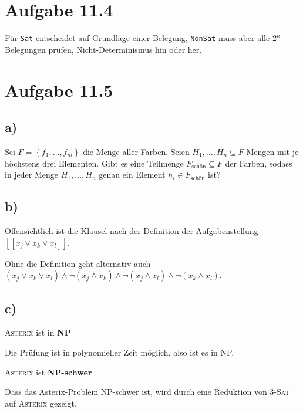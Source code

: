 \documentclass{article}
\begin{document}
\section*{Aufgabe 11.4}
Für \texttt{Sat} entscheidet auf Grundlage einer Belegung, \texttt{NonSat} muss aber alle $2^n$ Belegungen prüfen, Nicht-Determinismus hin oder her. 



\section*{Aufgabe 11.5}
\subsection*{a)}
Sei $F = \left\{f_1, \dots, f_m\right\}$ die Menge aller Farben. Seien $H_1, \dots, H_n \subseteq F$ Mengen mit je höchstens drei Elementen. Gibt es eine Teilmenge $F_{\text{schön}}\subseteq F$ der Farben, sodass in jeder Menge $H_1, \dots, H_n$ genau ein Element $h_i \in F_{\text{schön}}$ ist?


\subsection*{b)}
Offensichtlich ist die Klausel nach der Definition der Aufgabenstellung \\$[[x_j \vee x_k \vee x_l]]$.

Ohne die Definition geht alternativ auch \\$(x_j \vee x_k \vee x_l) \wedge \neg ( x_j \wedge x_k ) \wedge \neg (x_j \wedge x_l) \wedge \neg (x_k \wedge x_l)$.


\subsection*{c)}
\textsc{Asterix} ist in \textbf{NP}

Die Prüfung ist in polynomieller Zeit möglich, also ist es in NP.

\bigskip

\textsc{Asterix} ist \textbf{NP-schwer}

Dass das Asterix-Problem NP-schwer ist, wird durch eine Reduktion von 3-\textsc{Sat} auf \textsc{Asterix} gezeigt.

\smallskip
\end{document}
